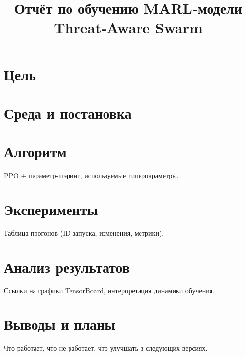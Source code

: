 \documentclass[12pt]{article}
\title{Отчёт по обучению MARL‑модели Threat‑Aware Swarm}
\author{}
\date{}
\begin{document}
\maketitle

\section{Цель}

\section{Среда и постановка}

\section{Алгоритм}
PPO + параметр‑шэринг, используемые гиперпараметры.

\section{Эксперименты}
Таблица прогонов (ID запуска, изменения, метрики).

\section{Анализ результатов}
Ссылки на графики TensorBoard, интерпретация динамики обучения.

\section{Выводы и планы}
Что работает, что не работает, что улучшать в следующих версиях.
\end{document}
